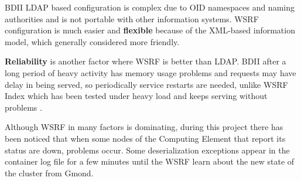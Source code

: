 BDII LDAP based configuration is complex due to OID namespaces and naming authorities and is not portable with other information systems. WSRF configuration is much easier and {\bf flexible} because of the XML-based information model, which generally considered more friendly.

{\bf Reliability} is another factor where WSRF is better than LDAP. BDII after a long period of heavy activity has memory usage problems and requests may have delay in being served, so periodically service restarts are needed, unlike WSRF Index which has been tested under heavy load and keeps serving without problems \cite{schopf2006monitoring}.

Although WSRF in many factors is dominating, during this project there has been noticed that when some nodes of the Computing Element that report its status are down, problems occur. Some deserialization exceptions appear in the container log file for a few minutes until the WSRF learn about the new state of the cluster from Gmond.

